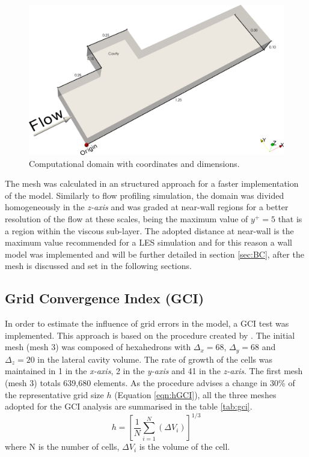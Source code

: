 \documentclass[../main.tex]{subfiles}
\begin{document}
\begin{figure}[!ht]
  \centering
  \includegraphics[width=\linewidth]{../images/methods/geometry.png}
  \caption{Computational domain with coordinates and dimensions.}
  \label{fig:geometry}
\end{figure}

The mesh was calculated in an structured approach for a faster implementation of the model.  Similarly to flow profiling simulation, the domain was divided homogeneously in the \textit{z-axis} and was graded at near-wall regions for a better resolution of the flow at these scales, being the maximum value of $y^{+}=5$ that is a region within the viscous sub-layer. The adopted distance at near-wall is the maximum value recommended for a LES simulation and for this reason a wall model was implemented and will be further detailed in section \ref{sec:BC}, after the mesh is discussed and set in the following sections.

\subsection{Grid Convergence Index (GCI)}
In order to estimate the influence of grid errors in the model, a GCI test was implemented. This approach is based on the procedure created by \textcite{celik2008}. The initial mesh (mesh 3) was composed of hexahedrons with $\Delta_x =68$, $\Delta_y = 68$ and $\Delta_z = 20$ in the lateral cavity volume. The rate of growth of the cells was maintained in 1 in the \textit{x-axis}, 2 in the \textit{y-axis} and 41 in the \textit{z-axis}. The first mesh (mesh 3) totals 639,680 elements. As the procedure advises a change in 30\% of the representative grid size $h$ (Equation \ref{eqn:hGCI}),  all the three meshes adopted for the GCI analysis are summarised in the table \ref{tab:gci}.
\begin{equation}
h=\left [\frac{1}{N}\sum_{i=1}^{N}(\Delta V  _i)\right ]^{1/3}
\label{eqn:hGCI}
\end{equation}
where N is the number of cells, $\Delta V_i$ is the volume of the cell.
\end{document}
